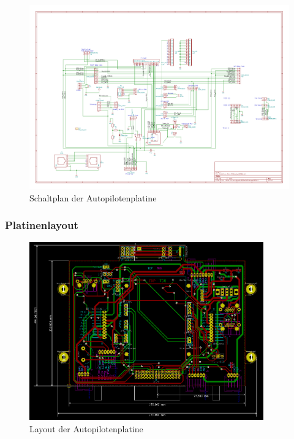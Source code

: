 \newpage

\begin{figure}[H]
\centering
\includegraphics[width=1.25\textwidth,angle =90]{bilder/Centerbox/Centerbox-Rear-Pixhawk_AUVSI16} 
\caption{Schaltplan der Autopilotenplatine} 
\label{fig:Schaltplan der Autopilotenplatine}
\end{figure}

\subsubsection{Platinenlayout}

\begin{figure}[H]
\centering
\includegraphics[width=0.9\textwidth]{bilder/Centerbox/Centerbox-Rear-Pixhawk_AUVSI_2016_rev-01-layout.png} 
\caption{Layout der Autopilotenplatine} 
\label{fig:Layout der Autopilotenplatine}
\end{figure}

